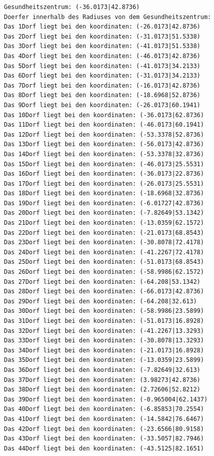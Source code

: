 \documentclass{article}
\begin{document}
\begin{verbatim}
Gesundheitszentrum: (-36.0173|42.8736)
Doerfer innerhalb des Radiuses von dem Gesundheitszentrum: 
Das 1Dorf liegt bei den koordinaten: (-26.0173|42.8736)
Das 2Dorf liegt bei den koordinaten: (-31.0173|51.5338)
Das 3Dorf liegt bei den koordinaten: (-41.0173|51.5338)
Das 4Dorf liegt bei den koordinaten: (-46.0173|42.8736)
Das 5Dorf liegt bei den koordinaten: (-41.0173|34.2133)
Das 6Dorf liegt bei den koordinaten: (-31.0173|34.2133)
Das 7Dorf liegt bei den koordinaten: (-16.0173|42.8736)
Das 8Dorf liegt bei den koordinaten: (-18.6968|52.8736)
Das 9Dorf liegt bei den koordinaten: (-26.0173|60.1941)
Das 10Dorf liegt bei den koordinaten: (-36.0173|62.8736)
Das 11Dorf liegt bei den koordinaten: (-46.0173|60.1941)
Das 12Dorf liegt bei den koordinaten: (-53.3378|52.8736)
Das 13Dorf liegt bei den koordinaten: (-56.0173|42.8736)
Das 14Dorf liegt bei den koordinaten: (-53.3378|32.8736)
Das 15Dorf liegt bei den koordinaten: (-46.0173|25.5531)
Das 16Dorf liegt bei den koordinaten: (-36.0173|22.8736)
Das 17Dorf liegt bei den koordinaten: (-26.0173|25.5531)
Das 18Dorf liegt bei den koordinaten: (-18.6968|32.8736)
Das 19Dorf liegt bei den koordinaten: (-6.01727|42.8736)
Das 20Dorf liegt bei den koordinaten: (-7.82649|53.1342)
Das 21Dorf liegt bei den koordinaten: (-13.0359|62.1572)
Das 22Dorf liegt bei den koordinaten: (-21.0173|68.8543)
Das 23Dorf liegt bei den koordinaten: (-30.8078|72.4178)
Das 24Dorf liegt bei den koordinaten: (-41.2267|72.4178)
Das 25Dorf liegt bei den koordinaten: (-51.0173|68.8543)
Das 26Dorf liegt bei den koordinaten: (-58.9986|62.1572)
Das 27Dorf liegt bei den koordinaten: (-64.208|53.1342)
Das 28Dorf liegt bei den koordinaten: (-66.0173|42.8736)
Das 29Dorf liegt bei den koordinaten: (-64.208|32.613)
Das 30Dorf liegt bei den koordinaten: (-58.9986|23.5899)
Das 31Dorf liegt bei den koordinaten: (-51.0173|16.8928)
Das 32Dorf liegt bei den koordinaten: (-41.2267|13.3293)
Das 33Dorf liegt bei den koordinaten: (-30.8078|13.3293)
Das 34Dorf liegt bei den koordinaten: (-21.0173|16.8928)
Das 35Dorf liegt bei den koordinaten: (-13.0359|23.5899)
Das 36Dorf liegt bei den koordinaten: (-7.82649|32.613)
Das 37Dorf liegt bei den koordinaten: (3.98273|42.8736)
Das 38Dorf liegt bei den koordinaten: (2.72606|52.8212)
Das 39Dorf liegt bei den koordinaten: (-0.965004|62.1437)
Das 40Dorf liegt bei den koordinaten: (-6.85853|70.2554)
Das 41Dorf liegt bei den koordinaten: (-14.5842|76.6467)
Das 42Dorf liegt bei den koordinaten: (-23.6566|80.9158)
Das 43Dorf liegt bei den koordinaten: (-33.5057|82.7946)
Das 44Dorf liegt bei den koordinaten: (-43.5125|82.1651)

\end{verbatim}
\end{document}

